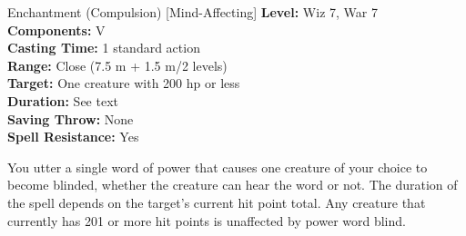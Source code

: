 {Enchantment (Compulsion) [Mind-Affecting]}
{
	\textbf{Level:}
	Wiz 7, War 7\\
	\textbf{Components:}
	V\\
	\textbf{Casting Time:}
	1 standard action\\
	\textbf{Range:}
	Close (7.5 m + 1.5 m/2 levels)\\
	\textbf{Target:}
	One creature with 200 hp or less\\
	\textbf{Duration:}
	See text\\
	\textbf{Saving Throw:}
	None\\
	\textbf{Spell Resistance:}
	Yes\\
}
{

	You utter a single word of power that causes one creature of your choice to become blinded, whether the creature can hear the word or not. The duration of the spell depends on the target's current hit point total. Any creature that currently has 201 or more hit points is unaffected by power word blind.

}

